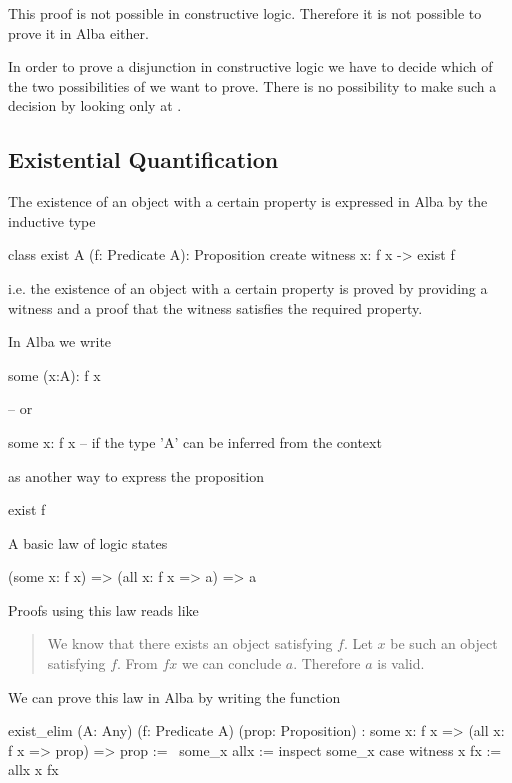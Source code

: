 This proof is not possible in constructive logic. Therefore it is not possible
to prove it in Alba either.

In order to prove a disjunction in constructive logic we have to decide which
of the two possibilities of  we want to prove. There is
no possibility to make such a decision by looking only at .











\subsection{Existential Quantification}

The existence of an object with a certain property is expressed in Alba by the
inductive type
%
\begin{alba}
    class
        exist A (f: Predicate A): Proposition
    create
        witness x: f x -> exist f
\end{alba}
%
i.e. the existence of an object with a certain property is proved by providing
a witness and a proof that the witness satisfies the required property.

In Alba we write
%
\begin{alba}
  some (x:A): f x

  -- or

  some x: f x   -- if the type 'A' can be inferred from the context
\end{alba}
%
as another way to express the proposition
%
\begin{alba}
  exist f
\end{alba}

A basic law of logic states
%
\begin{alba}
  (some x: f x) => (all x: f x => a) => a
\end{alba}
%
Proofs using this law reads like
\begin{quote}
  We know that there exists an object satisfying $f$. Let $x$ be such an
  object satisfying $f$. From $ f x$ we can conclude $a$. Therefore $a$ is
  valid.
\end{quote}

We can prove this law in Alba by writing the function
\begin{alba}
    exist_elim
        (A: Any)
        (f: Predicate A)
        (prop: Proposition)
        : some x: f x => (all x: f x => prop) => prop
    :=
        \   some_x
            allx
        :=
            inspect some_x case
                witness x fx :=
                    allx x fx
\end{alba}


